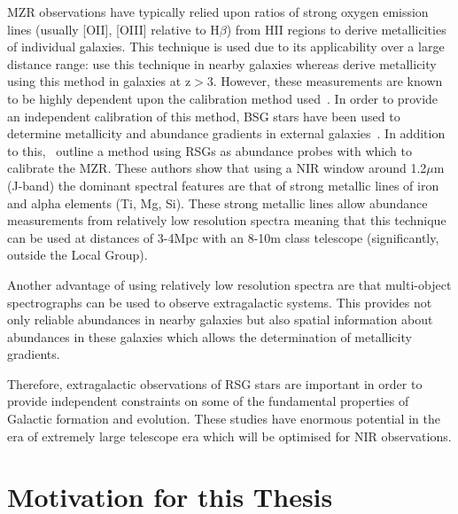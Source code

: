 MZR observations have typically relied upon ratios of strong oxygen emission lines (usually [OII], [OIII] relative to H$\beta$) from HII regions to derive metallicities of individual galaxies.
This technique is used due to its applicability over a large distance range:
\cite{2001MNRAS.323..887C} use this technique in nearby galaxies whereas \cite{Maiolino08} derive metallicity using this method in galaxies at z$>$3.
However, these measurements are known to be highly dependent upon the calibration method used~\citep{Kewley08, Kudritzki08,Bresolin09}.
In order to provide an independent calibration of this method, BSG stars have been used to determine metallicity and abundance gradients in external galaxies~\citep{Kudritzki12}.
In addition to this,~\cite{Davies13b} outline a method using RSGs as abundance probes with which to calibrate the MZR.
These authors show that using a NIR window around 1.2$\mu$m (J-band) the dominant spectral features are that of strong metallic lines of iron and alpha elements (Ti, Mg, Si).
These strong metallic lines allow abundance measurements from relatively low resolution spectra meaning that this technique can be used at distances of 3-4Mpc with an 8-10m class telescope (significantly, outside the Local Group).


Another advantage of using relatively low resolution spectra are that multi-object spectrographs can be used to observe extragalactic systems.
This provides not only reliable abundances in nearby galaxies but also spatial information about abundances in these galaxies which allows the determination of metallicity gradients.

Therefore, extragalactic observations of RSG stars are important in order to provide independent constraints on some of the fundamental properties of Galactic formation and evolution.
These studies have enormous potential in the era of extremely large telescope era which will be optimised for NIR observations.


\section{Motivation for this Thesis} %
\label{sec:motivation_for_this_thesis}

